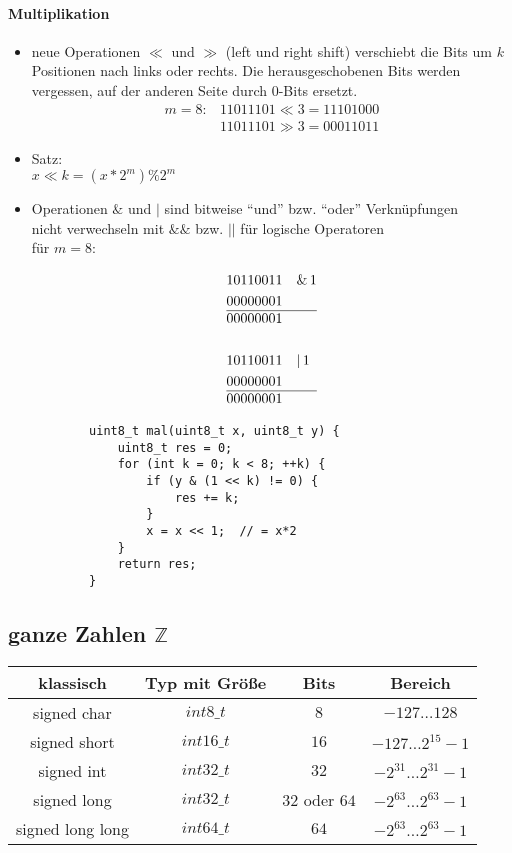 \documentclass{article}
\begin{document}
	\paragraph{Multiplikation}
	\begin{itemize}
		\item neue Operationen $\ll$ und $\gg$ (left und right shift)
		verschiebt die Bits um $k$ Positionen nach links oder rechts. Die herausgeschobenen Bits werden vergessen, auf der anderen Seite durch $0$-Bits ersetzt. \\
		\begin{align*}
			m = 8 : & 11011101 \ll 3 = 11101000 \\
			& 11011101 \gg 3 = 00011011
		\end{align*}
		\item Satz: \\
			$x \ll k = (x*2^m) \% 2^m$
		\item Operationen $\&$ und $|$ sind bitweise ``und'' bzw. ``oder'' Verknüpfungen \\
		nicht verwechseln mit $\&\&$ bzw. $||$ für logische Operatoren \\ für $m=8:$

			\begin{align*}
				&1 0 1 1 0 0 1 1  \quad \& \, 1 \\
				&0 0 0 0 0 0 0 1 \\ \hline 
				&0 0 0 0 0 0 0 1 \\ \\
				&1 0 1 1 0 0 1 1 \quad | \, 1 \\
				&0 0 0 0 0 0 0 1 \\ \hline
				&0 0 0 0 0 0 0 1 
			\end{align*}

	\begin{lstlisting}
		uint8_t mal(uint8_t x, uint8_t y) {
			uint8_t res = 0;
			for (int k = 0; k < 8; ++k) {
			    if (y & (1 << k) != 0) {
			    	res += k;
			    }
			    x = x << 1;  // = x*2
			}
			return res;
		}
	\end{lstlisting}	

\end{itemize}

\subsection{ganze Zahlen $\mathbb{Z}$}
	\begin{tabular} {c|c|c|c}
		klassisch & Typ mit Größe & Bits & Bereich \\ \hline
		signed char & $int8\_t$ & $8$ & $-127 \dots 128$ \\
		signed short & $int16\_t$ & $16$ & $-127 \dots 2^{15}-1 $ \\
		signed int & $int32\_t$ & $32$ & $-2^{31} \dots 2^{31}-1$ \\
		signed long & $int32\_t$ & $32$ oder $64$ & $-2^{63} \dots 2^{63}-1$\\
		signed long long & $int64\_t$ & $64$ & $-2^{63} \dots 2^{63}-1$ \\
	\end{tabular}
	
\end{document}
